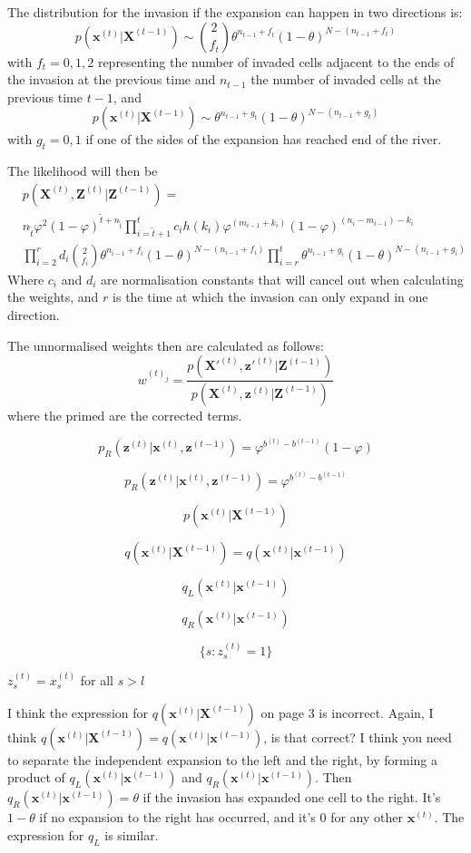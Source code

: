 \documentclass[11pt,a4paper]{article}
\renewcommand{\vec}[1]{\mathbf{#1}}
\begin{document}
The distribution for the invasion if the expansion can happen in two directions is:
\[
    p(\vec{x}^{(t)} | \vec{X}^{(t-1)}) \sim {2\choose f_t} \theta^{n_{t-1}+f_t} (1-\theta)^{N-(n_{t-1}+f_t)}
\]
with $f_t = {0,1,2}$ representing the number of invaded cells adjacent to the ends of the invasion at the previous time and $n_{t-1}$ the number of invaded cells at the previous time $t-1$, and
\[
    p(\vec{x}^{(t)} | \vec{X}^{(t-1)}) \sim \theta^{n_{t-1}+g_t} (1-\theta)^{N-(n_{t-1}+g_t)}
\]
with $g_t = {0,1}$ if one of the sides of the expansion has reached end of the river.

The likelihood will then be
\begin{align*}
        & p(\vec{X}^{(t)},\vec{Z}^{(t)} | \vec{Z}^{(t-1)}) = \\
        & n_{\tilde{t}}\varphi^2 (1-\varphi)^{\tilde{t}+ n_{\tilde{t}}}\prod_{i=\tilde{t}+1}^{t} c_i h(k_i) \varphi^{(m_{i-1}+k_i)} (1-\varphi)^{(n_i-m_{i-1})-k_i}\\
        & \prod_{i=2}^{r} d_i {2\choose f_i} \theta^{n_{i-1}+f_i} (1-\theta)^{N-(n_{i-1}+f_i)} \prod_{i=r}^{t} \theta^{n_{i-1}+g_i} (1-\theta)^{N-(n_{i-1}+g_i)} 
\end{align*}
Where $c_i$ and $d_i$ are normalisation constants that will cancel out when calculating the weights, and $r$ is the time at which the invasion can only expand in one direction.

The unnormalised weights then are calculated as follows:
\[
    w^{(t)_j} = \frac{p(\vec{X'}^{(t)},\vec{z'}^{(t)} | \vec{Z}^{(t-1)})}{p(\vec{X}^{(t)},\vec{z}^{(t)} | \vec{Z}^{(t-1)})}
\]
where the primed are the corrected terms.

\[
p_R(\vec{z}^{(t)} | \vec{x}^{(t)}, \vec{z}^{(t-1)}) = \varphi^{b^{(t)} - b^{(t-1)}} (1 - \varphi)
\]

\[
p_R(\vec{z}^{(t)} | \vec{x}^{(t)}, \vec{z}^{(t-1)}) = \varphi^{b^{(t)} - b^{(t-1)}}
\]

\[
p(\vec{x}^{(t)} | \vec{X}^{(t-1)})
\]


\[
q(\vec{x}^{(t)} | \vec{X}^{(t-1)}) = q(\vec{x}^{(t)} | \vec{x}^{(t-1)})
\]

\[
q_L(\vec{x}^{(t)} | \vec{x}^{(t-1)})
\]

\[
q_R(\vec{x}^{(t)} | \vec{x}^{(t-1)})
\]

\[
\{ s : z_s^{(t)} = 1 \}
\]

$z_s^{(t)} = x_s^{(t)}$ for all $s > l$

I think the expression for $q(\vec{x}^{(t)} | \vec{X}^{(t-1)})$ on page 3 is incorrect. Again, I think $q(\vec{x}^{(t)} | \vec{X}^{(t-1)}) = q(\vec{x}^{(t)} | \vec{x}^{(t-1)})$, is that correct? I think you need to separate the independent expansion to the left and the right, by forming a product of $q_L(\vec{x}^{(t)} | \vec{x}^{(t-1)})$ and $q_R(\vec{x}^{(t)} | \vec{x}^{(t-1)})$. Then $q_R(\vec{x}^{(t)} | \vec{x}^{(t-1)}) = \theta$ if the invasion has expanded one cell to the right. It's $1 - \theta$ if no expansion to the right has occurred, and it's 0 for any other $\vec{x}^{(t)}$. The expression for $q_L$ is similar.
\end{document}
